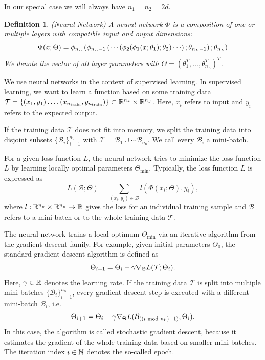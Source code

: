 \documentclass[twoside,a4paper]{article}
\newtheorem{definition}{Definition}
\begin{document}
In our special case we will always have $n_1 = n_2 = 2d$.

\begin{definition}
	(Neural Network)
	A neural network $\Phi$ is a composition of one or multiple layers with
	compatible input and ouput dimensions:
	\begin{equation*}
		\Phi(x;\Theta) = \phi_{n_L} \lb \phi_{n_L-1} \lb \cdots
		\lb \phi_2(
		\phi_1(x;\theta_1); \theta_2 ) \cdots \rb ; \theta_{n_L-1} \rb ; \theta_{n_L} \rb
	\end{equation*}
	We denote the vector of all
	layer parameters with $\Theta = (\theta_1^T, \dots, \theta_{n_L}^T)^T$.
\end{definition}

We use neural networks in the context of supervised learning. 
In supervised learning, we want to learn a function based on some training data
$\mathcal{T} = \{(x_1, y_1) \dots, (x_{n_{\text{train}}},y_{n_{\text{train}}}) \}
\subset \R^{n_x} \times \R^{n_y}$. Here, $x_i$ refers to input
and $y_i$ refers to the expected output.

If the training data $\mathcal{T}$ does not fit into memory,
we split the training data into disjoint subsets
$\{ \mathcal{B}_i \}_{i=1}^{n_{\text{b}}}$ with
$\mathcal{T} = \mathcal{B}_1 \cup \cdots \mathcal{B}_{n_{\text{b}}}$.
We call every $\mathcal{B}_i$ a mini-batch.

For a given loss function $L$, the neural network tries to minimize the loss 
function $L$ by learning locally optimal parameters $\Theta_{\text{min}}$.
Typically, the loss function $L$ is expressed as
\begin{equation*}
	L(\mathcal{B}; \Theta) = \sum_{(x_i,y_i) \in \mathcal{B}} l(\Phi(x_i; \Theta), y_i),
\end{equation*}
where $l : \R^{n_y} \times \R^{n_y} \to \R$ gives the loss for an 
individual training sample and $\mathcal{B}$ refers to a mini-batch
or to the whole training data $\mathcal{T}$.

The neural network trains a local optimum $\Theta_{\text{min}}$ via
an iterative algorithm from the gradient descent family. For example, given
initial parameters $\Theta_0$, the standard gradient descent algorithm is defined as
\begin{equation*}
	\Theta_{i+1} = \Theta_i - \gamma \grad[\Theta]{L(\mathcal{T};\Theta_{i})}
	.
\end{equation*}
Here, $\gamma \in \R$ denotes the learning rate.
If the training data $\mathcal{T}$ is split into multiple mini-batches 
$\{ \mathcal{B}_i \}_{i=1}^{n_{\text{b}}}$, every gradient-descent step
is executed with a different mini-batch $\mathcal{B}_i$, i.e.
\begin{equation*}
	\Theta_{i+1} = \Theta_i - \gamma \grad[\Theta]{L(
		\mathcal{B}_{((i \textrm{ mod } n_{\text{b}}) + 1)};
		\Theta_{i})}
	.
\end{equation*}
In this case, the algorithm is called stochastic gradient descent, because it estimates
the gradient of the whole training data based on smaller mini-batches.
The iteration index $i \in \N$ denotes the so-called epoch.
\end{document}

